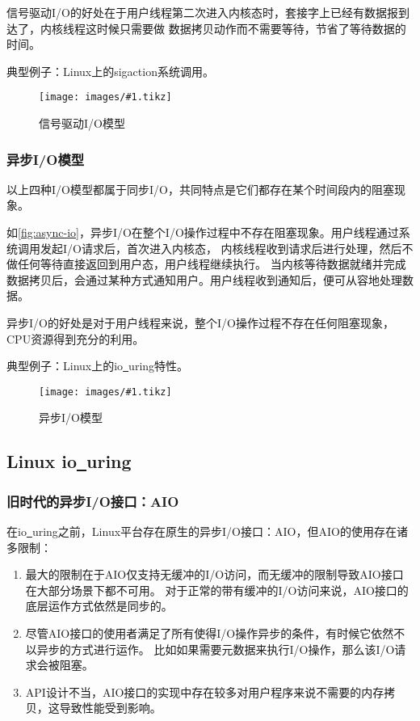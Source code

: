 \documentclass[supercite]{HustGraduPaper}
\newcommand{\cfig}[3]{
  \begin{figure}[htb]
    \centering
    \texttt{[image: images/\#1.tikz]}
    \caption{#3}
    \label{fig:#1}
  \end{figure}
}
\newcommand{\rfig}[1]{\autoref{fig:#1}}
\theoremstyle{definition}
\begin{document}
信号驱动I/O的好处在于用户线程第二次进入内核态时，套接字上已经有数据报到达了，内核线程这时候只需要做
数据拷贝动作而不需要等待，节省了等待数据的时间。\par

典型例子：Linux上的sigaction系统调用。\par

\cfig{signal-driven}{0.7}{信号驱动I/O模型}

\subsubsection{异步I/O模型}
以上四种I/O模型都属于同步I/O，共同特点是它们都存在某个时间段内的阻塞现象。\par

如\rfig{async-io}，异步I/O在整个I/O操作过程中不存在阻塞现象。用户线程通过系统调用发起I/O请求后，首次进入内核态，
内核线程收到请求后进行处理，然后不做任何等待直接返回到用户态，用户线程继续执行。
当内核等待数据就绪并完成数据拷贝后，会通过某种方式通知用户。用户线程收到通知后，便可从容地处理数据。\par

异步I/O的好处是对于用户线程来说，整个I/O操作过程不存在任何阻塞现象，CPU资源得到充分的利用。\par

典型例子：Linux上的io\underline{~}uring特性。\par

\cfig{async-io}{0.7}{异步I/O模型}

\subsection{Linux io\underline{~}uring}

\subsubsection{旧时代的异步I/O接口：AIO}
在io\underline{~}uring之前，Linux平台存在原生的异步I/O接口：AIO，但AIO的使用存在诸多限制：

\begin{enumerate}[label={(\arabic*)}]
  \item 最大的限制在于AIO仅支持无缓冲的I/O访问，而无缓冲的限制导致AIO接口在大部分场景下都不可用。
    对于正常的带有缓冲的I/O访问来说，AIO接口的底层运作方式依然是同步的。
  \item 尽管AIO接口的使用者满足了所有使得I/O操作异步的条件，有时候它依然不以异步的方式进行运作。
    比如如果需要元数据来执行I/O操作，那么该I/O请求会被阻塞。
  \item API设计不当，AIO接口的实现中存在较多对用户程序来说不需要的内存拷贝，这导致性能受到影响。
\end{enumerate}
\end{document}
